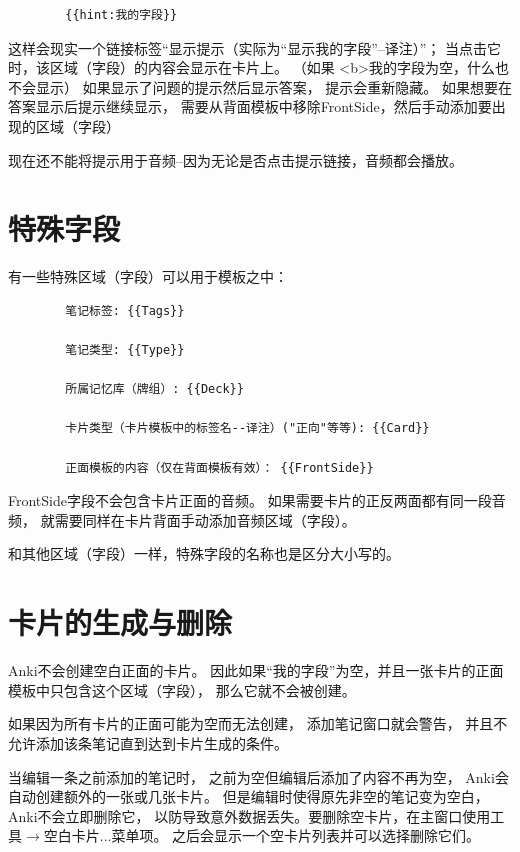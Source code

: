 \documentclass[a4paper]{book}
\begin{document}
	\begin{shaded}\begin{verbatim}
		{{hint:我的字段}}
		\end{verbatim}\end{shaded}
	这样会现实一个链接标签“显示提示（实际为“显示我的字段”--译注）”； 当点击它时，该区域（字段）的内容会显示在卡片上。 （如果
	<b>我的字段为空，什么也不会显示）
	如果显示了问题的提示然后显示答案， 提示会重新隐藏。 如果想要在答案显示后提示继续显示， 需要从背面模板中移除{{FrontSide}}，然后手动添加要出现的区域（字段）
	
	\begin{shaded}
		现在还不能将提示用于音频--因为无论是否点击提示链接，音频都会播放。
	\end{shaded}
	
	\section{特殊字段}
	有一些特殊区域（字段）可以用于模板之中：
	\begin{shaded}\begin{verbatim}
		笔记标签: {{Tags}}
		
		笔记类型: {{Type}}
		
		所属记忆库（牌组）: {{Deck}}
		
		卡片类型（卡片模板中的标签名--译注）("正向"等等): {{Card}}
		
		正面模板的内容（仅在背面模板有效）： {{FrontSide}}
		\end{verbatim}\end{shaded}
	FrontSide字段不会包含卡片正面的音频。 如果需要卡片的正反两面都有同一段音频， 就需要同样在卡片背面手动添加音频区域（字段）。
	
	和其他区域（字段）一样，特殊字段的名称也是区分大小写的。
	\section{卡片的生成与删除}
	Anki不会创建空白正面的卡片。 因此如果“我的字段”为空，并且一张卡片的正面模板中只包含这个区域（字段）， 那么它就不会被创建。
	
	如果因为所有卡片的正面可能为空而无法创建， 添加笔记窗口就会警告， 并且不允许添加该条笔记直到达到卡片生成的条件。
	
	当编辑一条之前添加的笔记时， 之前为空但编辑后添加了内容不再为空， Anki会自动创建额外的一张或几张卡片。 但是编辑时使得原先非空的笔记变为空白，Anki不会立即删除它， 以防导致意外数据丢失。要删除空卡片，在主窗口使用工具$\to$空白卡片...菜单项。 之后会显示一个空卡片列表并可以选择删除它们。
	
\end{document}
